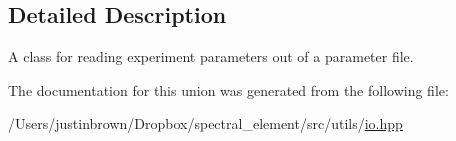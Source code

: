 \subsection{Detailed Description}
A class for reading experiment parameters out of a parameter file. 



 

The documentation for this union was generated from the following file\-:\begin{DoxyCompactItemize}
\item 
/\-Users/justinbrown/\-Dropbox/spectral\-\_\-element/src/utils/\hyperlink{io_8hpp}{io.\-hpp}\end{DoxyCompactItemize}
